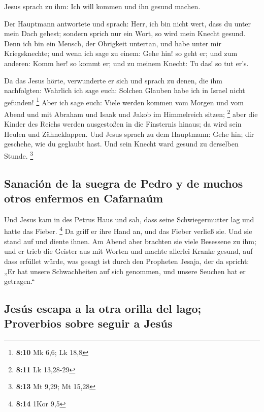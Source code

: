  Jesus sprach zu ihm: Ich will kommen und ihn gesund
machen.

 Der Hauptmann antwortete und sprach: Herr, ich bin nicht
wert, dass du unter mein Dach gehest; sondern sprich nur ein Wort, so
wird mein Knecht gesund.  Denn ich bin ein Mensch, der
Obrigkeit untertan, und habe unter mir Kriegsknechte; und wenn ich sage
zu einem: Gehe hin! so geht er; und zum anderen: Komm her! so kommt er;
und zu meinem Knecht: Tu das! so tut er's.

 Da das Jesus hörte, verwunderte er sich und sprach zu
denen, die ihm nachfolgten: Wahrlich ich sage euch: Solchen Glauben habe
ich in Israel nicht gefunden! \footnote{\textbf{8:10} Mk 6,6; Lk 18,8}
 Aber ich sage euch: Viele werden kommen vom Morgen und
vom Abend und mit Abraham und Isaak und Jakob im Himmelreich sitzen;
\footnote{\textbf{8:11} Lk 13,28-29}  aber die Kinder des
Reichs werden ausgestoßen in die Finsternis hinaus; da wird sein Heulen
und Zähneklappen.  Und Jesus sprach zu dem Hauptmann:
Gehe hin; dir geschehe, wie du geglaubt hast. Und sein Knecht ward
gesund zu derselben Stunde. \footnote{\textbf{8:13} Mt 9,29; Mt 15,28}

\hypertarget{sanaciuxf3n-de-la-suegra-de-pedro-y-de-muchos-otros-enfermos-en-cafarnauxfam}{%
\subsection{Sanación de la suegra de Pedro y de muchos otros enfermos en
Cafarnaúm}\label{sanaciuxf3n-de-la-suegra-de-pedro-y-de-muchos-otros-enfermos-en-cafarnauxfam}}

 Und Jesus kam in des Petrus Haus und sah, dass seine
Schwiegermutter lag und hatte das Fieber. \footnote{\textbf{8:14} 1Kor
  9,5}  Da griff er ihre Hand an, und das Fieber verließ
sie. Und sie stand auf und diente ihnen.  Am Abend aber
brachten sie viele Besessene zu ihm; und er trieb die Geister aus mit
Worten und machte allerlei Kranke gesund,  auf dass
erfüllet würde, was gesagt ist durch den Propheten Jesaja, der da
spricht: „Er hat unsere Schwachheiten auf sich genommen, und unsere
Seuchen hat er getragen.``

\hypertarget{jesuxfas-escapa-a-la-otra-orilla-del-lago-proverbios-sobre-seguir-a-jesuxfas}{%
\subsection{Jesús escapa a la otra orilla del lago; Proverbios sobre
seguir a
Jesús}\label{jesuxfas-escapa-a-la-otra-orilla-del-lago-proverbios-sobre-seguir-a-jesuxfas}}

